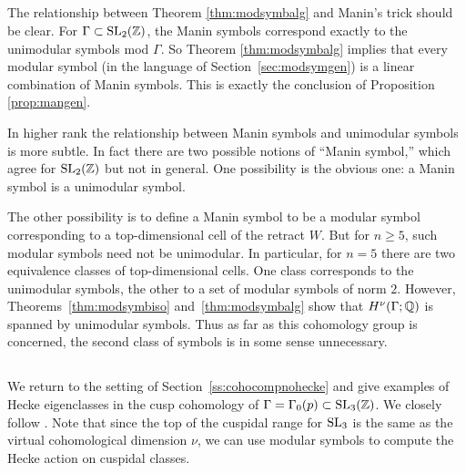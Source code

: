 \subsection{}\label{sec:retractandmanin}
%
The relationship between Theorem \ref{thm:modsymbalg} and Manin's
trick should be clear.  For $\Gamma \subset \operatorname{SL}_{2} (\mathbb{Z})$, the Manin
symbols correspond exactly to the unimodular symbols mod $\Gamma$.  So
Theorem \ref{thm:modsymbalg} implies that every modular symbol (in the
language of Section~\ref{sec:modsymgen}) is a linear combination of Manin
symbols.  This is exactly the conclusion of Proposition
\ref{prop:mangen}.

In higher rank the relationship between Manin symbols and unimodular
symbols is more subtle.  In fact there are two possible notions of
``Manin symbol,'' which agree for $\operatorname{SL}_{2} (\mathbb{Z})$ but not in general.
One possibility is the obvious one: a Manin symbol is a unimodular
symbol.  

The other possibility is to define a Manin symbol to be a modular
symbol corresponding to a top-dimensional cell of the retract $W$.
But for $n\geq 5$, such modular symbols need not be unimodular.  In
particular, for $n=5$ there are two equivalence classes of
top-dimensional cells.  One class corresponds to the unimodular
symbols, the other to a set of modular symbols of norm $2$.  However,
Theorems~\ref{thm:modsymbiso} and~\ref{thm:modsymbalg} show that
$H^{\nu} (\Gamma ; \mathbb{Q})$ is spanned by unimodular symbols.  Thus as far
as this cohomology group is concerned, the second class of symbols is
in some sense unnecessary.


\subsection{}\label{ss:cohocomphecke}
%
We return to the setting of Section~\ref{ss:cohocompnohecke} and give
examples of Hecke eigenclasses in the cusp cohomology of $\Gamma =
\Gamma_{0} (p)\subset \operatorname{SL}_{3} (\mathbb{Z})$.  We closely follow \cite{agg,
fourdutch}.  Note that since the top of the cuspidal range for
$\operatorname{SL}_{3}$ is the same
as the virtual cohomological dimension $\nu$, we can use modular
symbols to compute the Hecke action on cuspidal classes.

